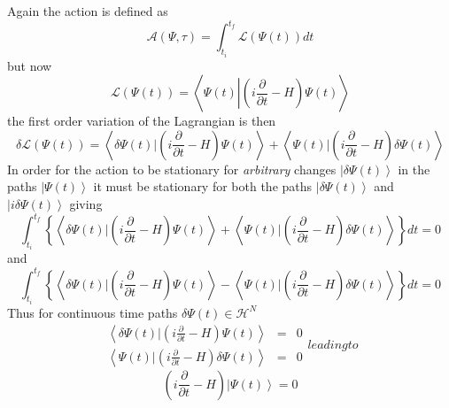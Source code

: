 \documentclass[aps,preprint]{revtex4}
\begin{document}
Again the action is defined as%
\begin{equation}
\mathcal{A}\left( \Psi ,\tau \right) =\int_{t_{i}}^{t_{f}}\mathcal{L}\left(
\Psi \left( t\right) \right) dt
\end{equation}%
but now 
\begin{equation}
\mathcal{L}\left( \Psi \left( t\right) \right) =\left\langle \Psi \left(
t\right) \left\vert \left( i\frac{\partial }{\partial t}-H\right) \right.
\Psi \left( t\right) \right\rangle
\end{equation}%
the first order variation of the Lagrangian is then%
\begin{equation}
\delta \mathcal{L}\left( \Psi \left( t\right) \right) =\left\langle \delta
\Psi \left( t\right) |\left( i\frac{\partial }{\partial t}-H\right) \Psi
\left( t\right) \right\rangle +\left\langle \Psi \left( t\right) |\left( i%
\frac{\partial }{\partial t}-H\right) \delta \Psi \left( t\right)
\right\rangle
\end{equation}%
In order for the action to be stationary for \emph{arbitrary }changes $%
\left\vert \delta \Psi \left( t\right) \right\rangle $ in the paths $%
\left\vert \Psi \left( t\right) \right\rangle $ it must be stationary for
both the paths $\left\vert \delta \Psi \left( t\right) \right\rangle $ and $%
\left\vert i\delta \Psi \left( t\right) \right\rangle $ giving 
\begin{equation}
\int_{t_{i}}^{t_{f}}\left\{ \left\langle \delta \Psi \left( t\right) |\left(
i\frac{\partial }{\partial t}-H\right) \Psi \left( t\right) \right\rangle
+\left\langle \Psi \left( t\right) |\left( i\frac{\partial }{\partial t}%
-H\right) \delta \Psi \left( t\right) \right\rangle \right\} dt=0
\end{equation}%
and 
\begin{equation}
\int_{t_{i}}^{t_{f}}\left\{ \left\langle \delta \Psi \left( t\right) |\left(
i\frac{\partial }{\partial t}-H\right) \Psi \left( t\right) \right\rangle
-\left\langle \Psi \left( t\right) |\left( i\frac{\partial }{\partial t}%
-H\right) \delta \Psi \left( t\right) \right\rangle \right\} dt=0
\end{equation}%
Thus for continuous time paths $\delta \Psi \left( t\right) \in \mathcal{H}%
^{N}$%
\begin{subequations}
\begin{eqnarray}
\left\langle \delta \Psi \left( t\right) |\left( i\frac{\partial }{\partial t%
}-H\right) \Psi \left( t\right) \right\rangle &=&0 \\
\left\langle \Psi \left( t\right) |\left( i\frac{\partial }{\partial t}%
-H\right) \delta \Psi \left( t\right) \right\rangle &=&0
\end{eqnarray}%
leading to 
\end{subequations}
\begin{equation}
\left( i\frac{\partial }{\partial t}-H\right) \left\vert \Psi \left(
t\right) \right\rangle =0
\end{equation}
\end{document}

